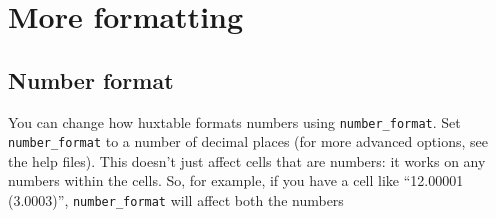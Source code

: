\documentclass[]{article}
\newenvironment{Shaded}{\begin{snugshade}}{\end{snugshade}}
\newcommand{\KeywordTok}[1]{\textcolor[rgb]{0.13,0.29,0.53}{\textbf{#1}}}
\newcommand{\DecValTok}[1]{\textcolor[rgb]{0.00,0.00,0.81}{#1}}
\newcommand{\FloatTok}[1]{\textcolor[rgb]{0.00,0.00,0.81}{#1}}
\newcommand{\StringTok}[1]{\textcolor[rgb]{0.31,0.60,0.02}{#1}}
\newcommand{\OperatorTok}[1]{\textcolor[rgb]{0.81,0.36,0.00}{\textbf{#1}}}
\newcommand{\NormalTok}[1]{#1}
\begin{document}
\FloatBarrier

\section{More formatting}\label{more-formatting}

\subsection{Number format}\label{number-format}

You can change how huxtable formats numbers using
\texttt{number\_format}. Set \texttt{number\_format} to a number of
decimal places (for more advanced options, see the help files). This
doesn't just affect cells that are numbers: it works on any numbers
within the cells. So, for example, if you have a cell like ``12.00001
(3.0003)'', \texttt{number\_format} will affect both the numbers

\begin{Shaded}
\end{Shaded}
\end{document}
